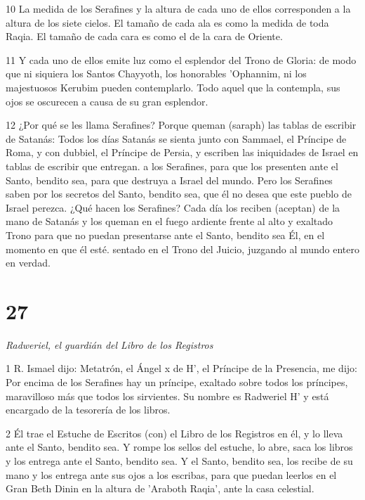 \par 10 La medida de los Serafines y la altura de cada uno de ellos corresponden a la altura de los siete cielos. El tamaño de cada ala es como la medida de toda Raqia. El tamaño de cada cara es como el de la cara de Oriente.

\par 11 Y cada uno de ellos emite luz como el esplendor del Trono de Gloria: de modo que ni siquiera los Santos Chayyoth, los honorables 'Ophannim, ni los majestuosos Kerubim pueden contemplarlo. Todo aquel que la contempla, sus ojos se oscurecen a causa de su gran esplendor.

\par 12 ¿Por qué se les llama Serafines? Porque queman (saraph) las tablas de escribir de Satanás: Todos los días Satanás se sienta junto con Sammael, el Príncipe de Roma, y ​​con dubbiel, el Príncipe de Persia, y escriben las iniquidades de Israel en tablas de escribir que entregan. a los Serafines, para que los presenten ante el Santo, bendito sea, para que destruya a Israel del mundo. Pero los Serafines saben por los secretos del Santo, bendito sea, que él no desea que este pueblo de Israel perezca. ¿Qué hacen los Serafines? Cada día los reciben (aceptan) de la mano de Satanás y los queman en el fuego ardiente frente al alto y exaltado Trono para que no puedan presentarse ante el Santo, bendito sea Él, en el momento en que él esté. sentado en el Trono del Juicio, juzgando al mundo entero en verdad.



\chapter{27}

\par \textit{Radweriel, el guardián del Libro de los Registros}

\par 1 R. Ismael dijo: Metatrón, el Ángel x de H', el Príncipe de la Presencia, me dijo: Por encima de los Serafines hay un príncipe, exaltado sobre todos los príncipes, maravilloso más que todos los sirvientes. Su nombre es Radweriel H' y está encargado de la tesorería de los libros.

\par 2 Él trae el Estuche de Escritos (con) el Libro de los Registros en él, y lo lleva ante el Santo, bendito sea. Y rompe los sellos del estuche, lo abre, saca los libros y los entrega ante el Santo, bendito sea. Y el Santo, bendito sea, los recibe de su mano y los entrega ante sus ojos a los escribas, para que puedan leerlos en el Gran Beth Dinin en la altura de 'Araboth Raqia', ante la casa celestial.

